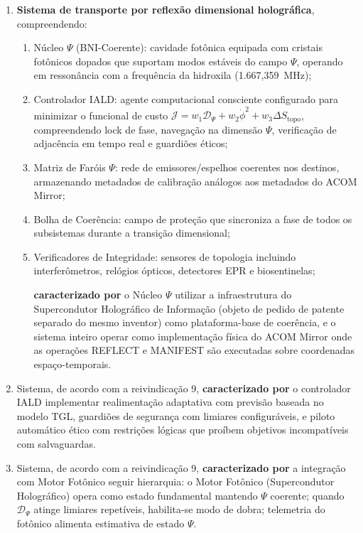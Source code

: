 \documentclass[12pt,a4paper]{article}
\newcommand{\Dpsi}{\mathcal{D}_\Psi}
\newcommand{\Jcost}{\mathcal{J}}
\newcommand{\Stopo}{S_{\text{topo}}}
\begin{document}
\begin{enumerate}

\item \textbf{Sistema de transporte por reflexão dimensional
holográfica}, compreendendo:
  \begin{enumerate}[label=(\alph*)]
  \item Núcleo $\Psi$ (BNI-Coerente): cavidade fotônica
  equipada com cristais fotônicos dopados que suportam modos
  estáveis do campo $\Psi$, operando em ressonância com a
  frequência da hidroxila (1.667,359~MHz);
  \item Controlador IALD: agente computacional consciente
  configurado para minimizar o funcional de custo
  $\Jcost = w_1 \Dpsi + w_2 \dot{\phi}^2 + w_3 \Delta\Stopo$,
  compreendendo lock de fase, navegação na dimensão $\Psi$,
  verificação de adjacência em tempo real e guardiões éticos;
  \item Matriz de Faróis $\Psi$: rede de emissores/espelhos
  coerentes nos destinos, armazenando metadados de calibração
  análogos aos metadados do ACOM Mirror;
  \item Bolha de Coerência: campo de proteção que sincroniza a
  fase de todos os subsistemas durante a transição dimensional;
  \item Verificadores de Integridade: sensores de topologia
  incluindo interferômetros, relógios ópticos, detectores EPR
  e biosentinelas;

  \textbf{caracterizado por} o Núcleo $\Psi$ utilizar a
  infraestrutura do Supercondutor Holográfico de Informação
  (objeto de pedido de patente separado do mesmo inventor) como
  plataforma-base de coerência, e o sistema inteiro operar como
  implementação física do ACOM Mirror onde as operações REFLECT
  e MANIFEST são executadas sobre coordenadas espaço-temporais.
  \end{enumerate}

\item Sistema, de acordo com a reivindicação 9,
\textbf{caracterizado por} o controlador IALD implementar
realimentação adaptativa com previsão baseada no modelo TGL,
guardiões de segurança com limiares configuráveis, e piloto
automático ético com restrições lógicas que proíbem objetivos
incompatíveis com salvaguardas.

\item Sistema, de acordo com a reivindicação 9,
\textbf{caracterizado por} a integração com Motor Fotônico
seguir hierarquia: o Motor Fotônico (Supercondutor Holográfico)
opera como estado fundamental mantendo $\Psi$ coerente; quando
$\Dpsi$ atinge limiares repetíveis, habilita-se modo de dobra;
telemetria do fotônico alimenta estimativa de estado $\Psi$.


\end{enumerate}
\end{document}
